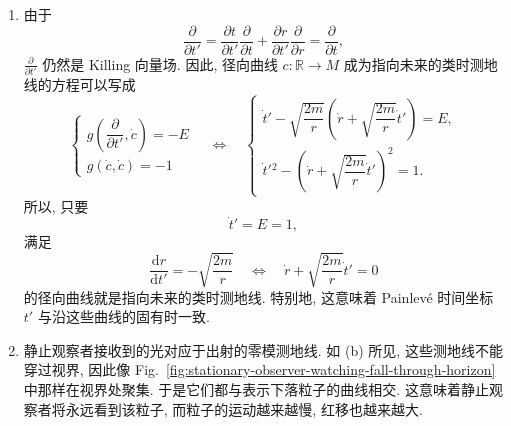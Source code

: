 \begin{description}[font=\normalfont,leftmargin=2em,labelwidth=1.5em]
\begin{enumerate}[label=(\alph*),ref=\alph*,leftmargin=*]
\item 由于
\[
  \frac{\partial}{\partial t'}
    =\frac{\partial t}{\partial t'}\frac{\partial}{\partial t}
     +\frac{\partial r}{\partial t'}\frac{\partial}{\partial r}
    =\frac{\partial}{\partial t},
\]
$\frac{\partial}{\partial t'}$ 仍然是 Killing 向量场. 因此, 径向曲线 $c:\mathbb{R}\to M$ 成为指向未来的类时测地线的方程可以写成
\[
  \begin{cases}
    g\left(\dfrac{\partial}{\partial t'},\dot c\right)=-E\\[.6ex]
    g(\dot c,\dot c)=-1
  \end{cases}
  \quad\Longleftrightarrow\quad
  \begin{cases}
    \dot t'-\sqrt{\dfrac{2m}{r}}\left(\dot r+\sqrt{\dfrac{2m}{r}}\dot t'\right)=E,\\[.6ex]
    \dot t'{}^2-\left(\dot r+\sqrt{\dfrac{2m}{r}}\dot t'\right)^2=1.
  \end{cases}
\]
所以, 只要
\[
  \dot t'=E=1,
\]
满足
\[
  \frac{\mathrm{d}r}{\mathrm{d}t'}=-\sqrt{\frac{2m}{r}}
     \quad\Longleftrightarrow\quad \dot r+\sqrt{\frac{2m}{r}}\dot t'=0
\]
的径向曲线就是指向未来的类时测地线. 特别地, 这意味着 Painlevé 时间坐标 $t'$ 与沿这些曲线的固有时一致.
\item 静止观察者接收到的光对应于出射的零模测地线. 如 (b) 所见, 这些测地线不能穿过视界, 因此像 Fig.~\ref{fig:stationary-observer-watching-fall-through-horizon} 中那样在视界处聚集. 于是它们都与表示下落粒子的曲线相交. 这意味着静止观察者将永远看到该粒子, 而粒子的运动越来越慢, 红移也越来越大.
\end{enumerate}
\end{description}
